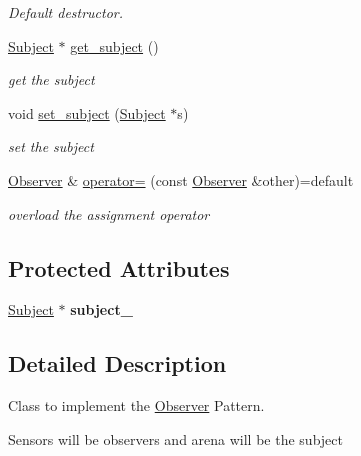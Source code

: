 \begin{DoxyCompactItemize}
\begin{DoxyCompactList}\small\item\em Default destructor. \end{DoxyCompactList}\item 
\hyperlink{classSubject}{Subject} $\ast$ \hyperlink{classObserver_ad02bd7b2e34b2677e14be8964238bd80}{get\+\_\+subject} ()
\begin{DoxyCompactList}\small\item\em get the subject \end{DoxyCompactList}\item 
void \hyperlink{classObserver_a2548ddac97f15c7301bb2b61274974a7}{set\+\_\+subject} (\hyperlink{classSubject}{Subject} $\ast$s)
\begin{DoxyCompactList}\small\item\em set the subject \end{DoxyCompactList}\item 
\hyperlink{classObserver}{Observer} \& \hyperlink{classObserver_ae8d8d5e6a4f25f0f8025f0a38c0b78d1}{operator=} (const \hyperlink{classObserver}{Observer} \&other)=default\hypertarget{classObserver_ae8d8d5e6a4f25f0f8025f0a38c0b78d1}{}\label{classObserver_ae8d8d5e6a4f25f0f8025f0a38c0b78d1}

\begin{DoxyCompactList}\small\item\em overload the assignment operator \end{DoxyCompactList}\end{DoxyCompactItemize}
\subsection*{Protected Attributes}
\begin{DoxyCompactItemize}
\item 
\hyperlink{classSubject}{Subject} $\ast$ {\bfseries subject\+\_\+}\hypertarget{classObserver_ab402e35a5251edf4710eb66f329809c8}{}\label{classObserver_ab402e35a5251edf4710eb66f329809c8}

\end{DoxyCompactItemize}


\subsection{Detailed Description}
Class to implement the \hyperlink{classObserver}{Observer} Pattern. 

Sensors will be observers and arena will be the subject 

